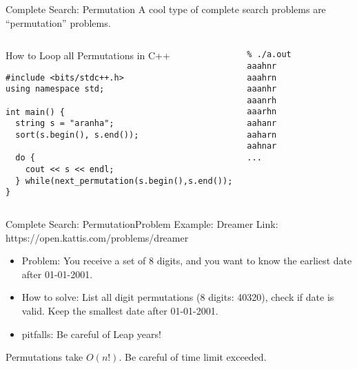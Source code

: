 \begin{frame}[fragile]{Complete Search: Permutation}
  A cool type of complete search problems are ``permutation''
  problems.

  \begin{columns}[t]
    \begin{block}{How to Loop all Permutations in C++}
\begin{verbatim}
#include <bits/stdc++.h>
using namespace std;

int main() {
  string s = "aranha";
  sort(s.begin(), s.end());

  do {
    cout << s << endl;
  } while(next_permutation(s.begin(),s.end());
}
\end{verbatim}
    \end{block}
\begin{verbatim}
% ./a.out
aaahnr
aaahrn
aaanhr
aaanrh
aaarhn
aahanr
aaharn
aahnar
...
\end{verbatim}
  \end{columns}
\end{frame}

\begin{frame}[t]{Complete Search: Permutation}{Problem Example: Dreamer}
  Link: https://open.kattis.com/problems/dreamer\bigskip

  \begin{itemize}
  \item \alert{Problem:} You receive a set of 8 digits, and you want to know the
  earliest date after 01-01-2001.\bigskip

  \item \alert{How to solve:} List all digit permutations (8 digits: 40320), check
    if date is valid. Keep the smallest date after 01-01-2001.\bigskip

  \item \alert{pitfalls:} Be careful of Leap years!
  \end{itemize}

  \vfill

  \begin{block}{}
    Permutations take $O(n!)$. Be careful of time limit exceeded.
  \end{block}
\end{frame}

